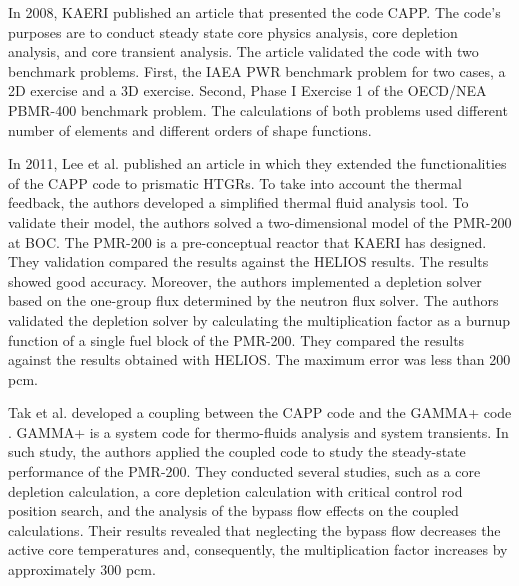 \documentclass[11pt,letterpaper]{article}
\begin{document}
In 2008, \gls{KAERI} published an article \cite{lee_development_2008} that presented the code CAPP.
The code's purposes are to conduct steady state core physics analysis, core depletion analysis, and core transient analysis.
The article validated the code with two benchmark problems.
First, the IAEA PWR benchmark problem for two cases, a 2D exercise and a 3D exercise.
Second, Phase I Exercise 1 of the OECD/NEA PBMR-400 benchmark problem.
The calculations of both problems used different number of elements and different orders of shape functions.

In 2011, Lee et al. published an article \cite{lee_development_2011} in which they extended the functionalities of the CAPP code to prismatic \glspl{HTGR}.
To take into account the thermal feedback, the authors developed a simplified thermal fluid analysis tool.
To validate their model, the authors solved a two-dimensional model of the PMR-200 at \gls{BOC}.
The PMR-200 is a pre-conceptual reactor that \gls{KAERI} has designed.
They validation compared the results against the HELIOS results.
The results showed good accuracy.
Moreover, the authors implemented a depletion solver based on the one-group flux determined by the neutron flux solver.
The authors validated the depletion solver by calculating the multiplication factor as a burnup function of a single fuel block of the PMR-200.
They compared the results against the results obtained with HELIOS.
The maximum error was less than 200 pcm.

Tak et al. \cite{tak_cappgamma_2016} developed a coupling between the CAPP code and the GAMMA+ code \cite{lim_gamma_2006}.
GAMMA+ is a system code for thermo-fluids analysis and system transients.
In such study, the authors applied the coupled code to study the steady-state performance of the PMR-200.
They conducted several studies, such as a core depletion calculation, a core depletion calculation with critical control rod position search, and the analysis of the bypass flow effects on the coupled calculations.
Their results revealed that neglecting the bypass flow decreases the active core temperatures and, consequently, the multiplication factor increases by approximately 300 pcm.
\end{document}
